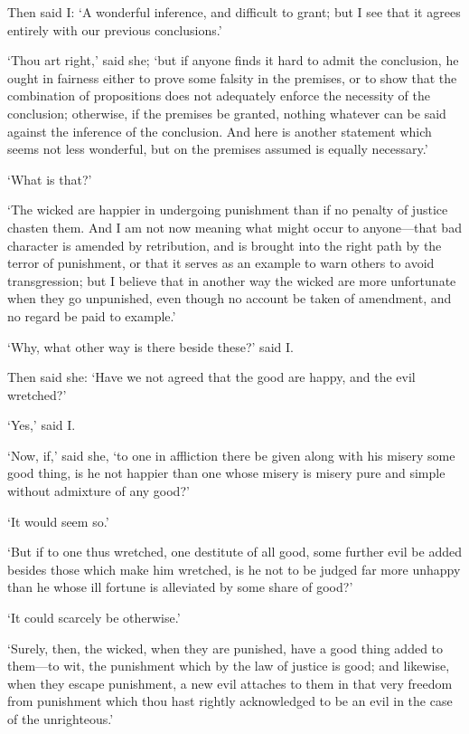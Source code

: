 \documentclass[11pt]{book}
\begin{document}
Then said I: `A wonderful inference, and difficult to grant; but I see
that it agrees entirely with our previous conclusions.'

`Thou art right,' said she; `but if anyone finds it hard to admit the
conclusion, he ought in fairness either to prove some falsity in the
premises, or to show that the combination of propositions does not
adequately enforce the necessity of the conclusion; otherwise, if the
premises be granted, nothing whatever can be said against the inference
of the conclusion. And here is another statement which seems not less
wonderful, but on the premises assumed is equally necessary.'

`What is that?'

`The wicked are happier in undergoing punishment than if no penalty of
justice chasten them. And I am not now meaning what might occur to
anyone---that bad character is amended by retribution, and is brought
into the right path by the terror of punishment, or that it serves as an
example to warn others to avoid transgression; but I believe that in
another way the wicked are more unfortunate when they go unpunished,
even \linebreak though no account be taken of amendment, and no regard be paid to
example.'

`Why, what other way is there beside these?' said I.

Then said she: `Have we not agreed that the good are happy, and the evil
wretched?'

`Yes,' said I.

`Now, if,' said she, `to one in affliction there be given along with his
misery some good thing, is he not happier than one whose misery is
misery pure and simple without admixture of any good?'

`It would seem so.'

`But if to one thus wretched, one destitute of all good, some further
evil be added besides those which make him wretched, is he not to be
judged far more unhappy than he whose ill fortune is alleviated by some
share of good?'

`It could scarcely be otherwise.'

`Surely, then, the wicked, when they are punished, have a good thing
added to them---to wit, the punishment which by the law of justice is
good; and likewise, when they escape punishment, a new evil attaches to
them in that very freedom from punishment which thou hast rightly
acknowledged to be an evil in the case of the unrighteous.'
\end{document}
